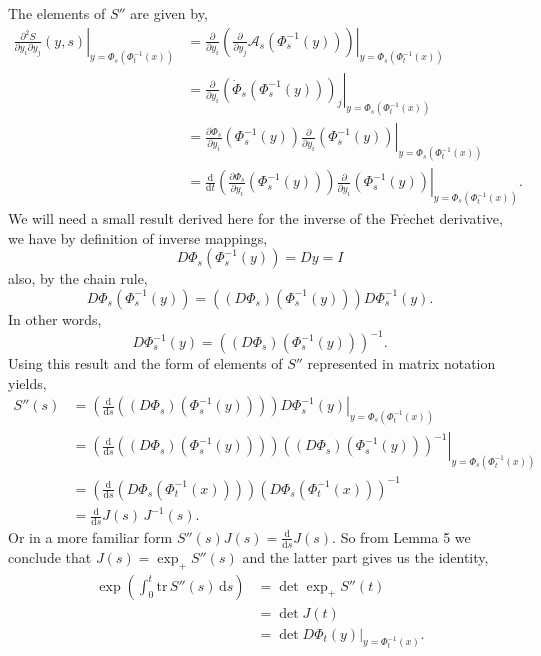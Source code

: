 \documentclass[a4paper,12pt,draft]{report}
\theoremstyle{remark}
\theoremstyle{definition}
\begin{document}
{
The elements of $S''$ are given by,
\begin{align}
\left.\frac{\partial^2 S}{\partial y_i \partial y_j}(y, s)\right|_{y = \Phi_s(\Phi_t^{-1}(x))} & = \left.\frac{\partial}{\partial y_i}\left(\frac{\partial}{\partial y_j}\mathscr{A}_s(\Phi_s^{-1}(y))\right)\right|_{y = \Phi_s(\Phi_t^{-1}(x))}\nonumber\\
& = \left.\frac{\partial}{\partial y_i}\left(\dot{\Phi}_s(\Phi_s^{-1}(y))\right)_j\right|_{y = \Phi_s(\Phi_t^{-1}(x))}\nonumber\\
& = \left.\frac{\partial \dot{\Phi}_s}{\partial y_i}(\Phi_s^{-1}(y))\frac{\partial}{\partial y_i}(\Phi_s^{-1}(y))\right|_{y = \Phi_s(\Phi_t^{-1}(x))}\nonumber\\
& = \left.\frac{\mathrm{d}}{\mathrm{d}t}\left(\frac{\partial \Phi_s}{\partial y_i}(\Phi_s^{-1}(y))\right)\frac{\partial}{\partial y_i}(\Phi_s^{-1}(y))\right|_{y = \Phi_s(\Phi_t^{-1}(x))}.\nonumber
\end{align}
We will need a small result derived here for the inverse of the Fr$\acute{\text{e}}$chet derivative, we have by definition of inverse mappings,
$$
D\Phi_s(\Phi_s^{-1}(y)) = Dy = I
$$
also, by the chain rule,
$$
D\Phi_s(\Phi_s^{-1}(y)) = ((D\Phi_s)(\Phi_s^{-1}(y)))D\Phi_s^{-1}(y).
$$
In other words,
$$
D\Phi_s^{-1}(y) = ((D\Phi_s)(\Phi_s^{-1}(y)))^{-1}.
$$
Using this result and the form of elements of $S''$ represented in matrix notation yields,
\begin{align}
S''(s) & = \left.\left(\frac{\mathrm{d}}{\mathrm{d}s}((D\Phi_s)(\Phi_s^{-1}(y)))\right)D\Phi_s^{-1}(y)\right|_{y = \Phi_s(\Phi_t^{-1}(x))}\nonumber\\
& = \left.\left(\frac{\mathrm{d}}{\mathrm{d}s}((D\Phi_s)(\Phi_s^{-1}(y)))\right)((D\Phi_s)(\Phi_s^{-1}(y)))^{-1}\right|_{y = \Phi_s(\Phi_t^{-1}(x))}\nonumber\\
& = \left(\frac{\mathrm{d}}{\mathrm{d}s}(D\Phi_s(\Phi_t^{-1}(x)))\right)(D\Phi_s(\Phi_t^{-1}(x)))^{-1}\nonumber\\
& = \frac{\mathrm{d}}{\mathrm{d}s}J(s)\,J^{-1}(s).\nonumber
\end{align}
Or in a more familiar form $S''(s)J(s) = \frac{\mathrm{d}}{\mathrm{d}s}J(s)$.  So from Lemma 5 we conclude that $J(s) = \exp_+S''(s)$ and the latter part gives us the identity,
\begin{align}
\exp\left(\int_0^t \mathrm{tr}\,S''(s)\,\mathrm{d}s\right) & = \det\exp_+ S''(t)\nonumber\\
& = \det J(t)\nonumber\\
& = \left.\det D\Phi_t(y)\right|_{y = \Phi_t^{-1}(x)}.\nonumber
\end{align}

\qedhere
}
\end{document}

